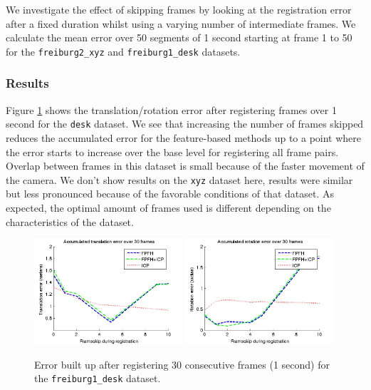\documentclass[a4paper]{article}
\begin{document}
We investigate the effect of skipping frames by looking at the registration error after a fixed duration whilst using a varying number of intermediate frames. We calculate the mean error over 50 segments of 1 second starting at frame 1 to 50 for the \texttt{freiburg2\_xyz} and \texttt{freiburg1\_desk} datasets.

\subsubsection{Results}

Figure \ref{fig:accumulated_error} shows the translation/rotation error after registering frames over 1 second for the \texttt{desk} dataset. We see that increasing the number of frames skipped reduces the accumulated error for the feature-based methods up to a point where the error starts to increase over the base level for registering all frame pairs. Overlap between frames in this dataset is small because of the faster movement of the camera.  We don't show results on the \texttt{xyz} dataset here, results were similar but less pronounced because of the favorable conditions of that dataset. As expected, the optimal amount of frames used is different depending on the characteristics of the dataset.

\begin{figure}[htbp]
    \centering
        \includegraphics[width=0.49\textwidth]{ims/deskAccumulatedtranslationerrorover30frames.png}
        \includegraphics[width=0.49\textwidth]{ims/deskAccumulatedrotationerrorover30frames.png}
    \caption{Error built up after registering 30 consecutive frames (1 second) for the \texttt{freiburg1\_desk} dataset.}
    \label{fig:accumulated_error}
\end{figure}
\end{document}
